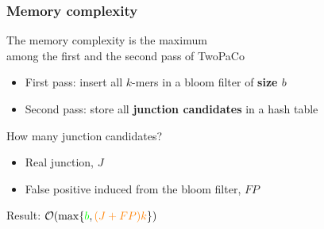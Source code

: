 \begin{frame}
  
	\frametitle{Memory complexity}

  \centering
	
	The memory complexity is the maximum \\ among the first and the second pass of TwoPaCo \\
	
	\medskip
	
	\begin{itemize}
	  \item[\textcolor{green}{\textbullet}] First pass: insert all $k$-mers in a bloom filter of \textbf{size $b$}
	  \item[\textcolor{orange}{\textbullet}] Second pass: store all \textbf{junction candidates} in a hash table
	\end{itemize}
	
	\medskip
	
	\pause
	
	How many junction candidates?
	
	\begin{itemize}
	  \item Real junction, $J$
	  \item False positive induced from the bloom filter, $FP$
	\end{itemize}

	\medskip
	
	\pause
	
	Result: $\mathcal{O}(\max\{{\color{green}b}, {\color{orange}(J+FP)k}\})$
	
	
\end{frame}


